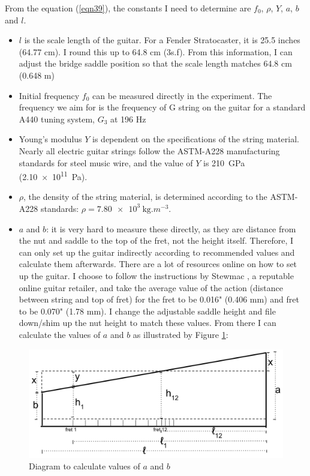 From the equation (\ref{eqn39}), the constants I need to determine are $f_0$, $\rho$, $Y$, $a$, $b$ and $l$. 
\begin{itemize}
    \item $l$ is the scale length of the guitar. For a Fender Stratocaster, it is 25.5 inches (64.77 cm). \cite{scale} I round this up to 64.8 cm (3s.f). From this information, I can adjust the bridge saddle position so that the scale length matches 64.8 cm (0.648 m)
    \item Initial frequency $f_0$ can be measured directly in the experiment. The frequency we aim for is the frequency of G string on the guitar for a standard A440 tuning system, $G_3$ at 196 Hz \cite{freq_chart}
    \item Young's modulus $Y$ is dependent on the specifications of the string material. Nearly all electric guitar strings follow the ASTM-A228 manufacturing standards for steel music wire, and the value of $Y$ is \SI{210}{\giga\pascal} (\SI{2.10e11}{\pascal}). \cite{astm} 
    \item $\rho$, the density of the string material, is determined according to the ASTM-A228 standards: $\rho = \SI{7.80e3}{\kg.m^{-3}}$. \cite{astm}
    \item $a$ and $b$: it is very hard to measure these directly, as they are distance from the nut and saddle to the top of the fret, not the height itself. Therefore, I can only set up the guitar indirectly according to recommended values and calculate them afterwards. There are a lot of resources online on how to set up the guitar. I choose to follow the instructions by Stewmac \cite{stewmac}, a reputable online guitar retailer, and take the average value of the action (distance between string and top of fret) for the  fret to be 0.016" (0.406 mm) and  fret to be 0.070" (1.78 mm). I change the adjustable saddle height and file down/shim up the nut height to match these values. From there I can calculate the values of $a$ and $b$ as illustrated by Figure \ref{fig3}: \par
\end{itemize}
\begin{figure}[!htbp]
    \includegraphics[width = \textwidth]{./ee/fig4.png}
    \caption{Diagram to calculate values of $a$ and $b$} \label{fig3}
\end{figure}
